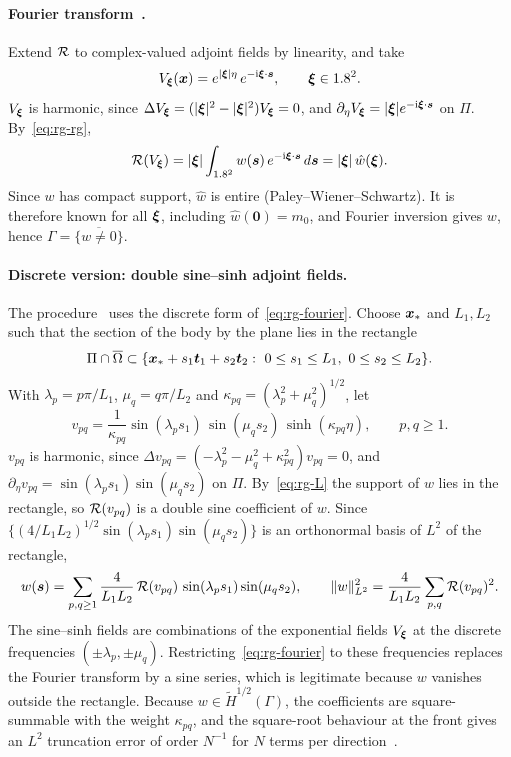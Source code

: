 \paragraph{Fourier transform~\cite{AB96}.} Extend $\mathcal{R}$ to complex-valued adjoint fields by linearity, and take
\[
V_{\bm{\xi}}(\bm{x})=e^{|\bm{\xi}|\eta}\,e^{-\mathrm i\bm{\xi}\cdot\bm{s}},\qquad\bm{\xi}\in1.8^2 .
\]
$V_{\bm{\xi}}$ is harmonic, since $\Delta V_{\bm{\xi}}=(|\bm{\xi}|^2-|\bm{\xi}|^2)V_{\bm{\xi}}=0$, and $\partial_\eta V_{\bm{\xi}}=|\bm{\xi}|e^{-\mathrm i\bm{\xi}\cdot\bm{s}}$ on $\Pi$. By~\eqref{eq:rg-rg},
\begin{equation}\label{eq:rg-fourier}
\mathcal{R}(V_{\bm{\xi}})=|\bm{\xi}|\int_{1.8^2}w(\bm{s})\,e^{-\mathrm i\bm{\xi}\cdot\bm{s}}\,d\bm{s}=|\bm{\xi}|\,\hat w(\bm{\xi}).
\end{equation}
Since $w$ has compact support, $\hat w$ is entire (Paley--Wiener--Schwartz). It is therefore known for all $\bm{\xi}$, including $\hat w(\mathbf 0)=m_0$, and Fourier inversion gives $w$, hence $\Gamma=\overline{\{w\ne0\}}$.

\paragraph{Discrete version: double sine--sinh adjoint fields.} The procedure~\cite{AC09} uses the discrete form of~\eqref{eq:rg-fourier}. Choose $\bm{x}_*$ and $L_1,L_2$ such that the section of the body by the plane lies in the rectangle
\begin{equation}\label{eq:rg-L}
\Pi\cap\overline\Omega\subset\{\bm{x}_*+s_1\bm{t}_1+s_2\bm{t}_2:\ 0\le s_1\le L_1,\ 0\le s_2\le L_2\}.
\end{equation}
With $\lambda_p=p\pi/L_1$, $\mu_q=q\pi/L_2$ and $\kappa_{pq}=(\lambda_p^2+\mu_q^2)^{1/2}$, let
\begin{equation}\label{eq:rg-vpq}
v_{pq}=\frac{1}{\kappa_{pq}}\sin(\lambda_ps_1)\,\sin(\mu_qs_2)\,\sinh(\kappa_{pq}\eta),\qquad p,q\ge1 .
\end{equation}
$v_{pq}$ is harmonic, since $\Delta v_{pq}=(-\lambda_p^2-\mu_q^2+\kappa_{pq}^2)v_{pq}=0$, and $\partial_\eta v_{pq}=\sin(\lambda_ps_1)\sin(\mu_qs_2)$ on $\Pi$. By~\eqref{eq:rg-L} the support of $w$ lies in the rectangle, so $\mathcal{R}(v_{pq})$ is a double sine coefficient of $w$. Since $\{(4/L_1L_2)^{1/2}\sin(\lambda_ps_1)\sin(\mu_qs_2)\}$ is an orthonormal basis of $L^2$ of the rectangle,
\begin{equation}\label{eq:rg-series}
w(\bm{s})=\sum_{p,q\ge1}\frac{4}{L_1L_2}\,\mathcal{R}(v_{pq})\,\sin(\lambda_ps_1)\sin(\mu_qs_2),\qquad
\|w\|_{L^2}^2=\frac{4}{L_1L_2}\sum_{p,q}\mathcal{R}(v_{pq})^2 .
\end{equation}
The sine--sinh fields are combinations of the exponential fields $V_{\bm{\xi}}$ at the discrete frequencies $(\pm\lambda_p,\pm\mu_q)$. Restricting~\eqref{eq:rg-fourier} to these frequencies replaces the Fourier transform by a sine series, which is legitimate because $w$ vanishes outside the rectangle. Because $w\in\tilde H^{1/2}(\Gamma)$, the coefficients are square-summable with the weight $\kappa_{pq}$, and the square-root behaviour at the front gives an $L^2$ truncation error of order $N^{-1}$ for $N$ terms per direction~\cite{LM72}.


